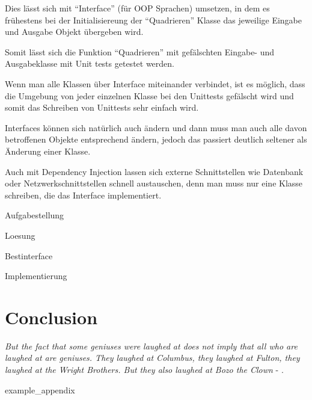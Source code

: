 \documentclass{article}
\begin{document}
    Dies lässt sich mit ``Interface'' (für OOP Sprachen) umsetzen, 
    in dem es frühestens bei der Initialisiereung der ``Quadrieren'' Klasse das jeweilige Eingabe und Ausgabe Objekt übergeben wird.

    Somit lässt sich die Funktion ``Quadrieren'' mit gefälschten Eingabe- und Ausgabeklasse mit Unit tests getestet werden.

    Wenn man alle Klassen über Interface miteinander verbindet, ist es möglich, dass die Umgebung von jeder einzelnen Klasse bei den Unittests gefälscht
    wird und somit das Schreiben von Unittests sehr einfach wird. 

    Interfaces können sich natürlich auch ändern und dann muss man auch alle davon betroffenen Objekte entsprechend ändern, 
    jedoch das passiert deutlich seltener als Änderung einer Klasse.

    Auch mit Dependency Injection lassen sich externe Schnittstellen wie Datenbank oder Netzwerkschnittstellen schnell austauschen, 
    denn man muss nur eine Klasse schreiben, die das Interface implementiert.
\newpage



{Aufgabestellung}

{Loesung}


\newpage
{Bestinterface}

\newpage
{Implementierung}

\section{Conclusion}
\textit{But the fact that some geniuses were laughed at does not imply that all who are laughed at are geniuses. They laughed at Columbus, they laughed at Fulton, they laughed at the Wright Brothers. But they also laughed at Bozo the Clown} -  \textcite{sagan_1993}.

\newpage
\printbibliography[heading = bibintoc, title = Bibliography]    %

\addappendix
{example_appendix}

\end{document}
